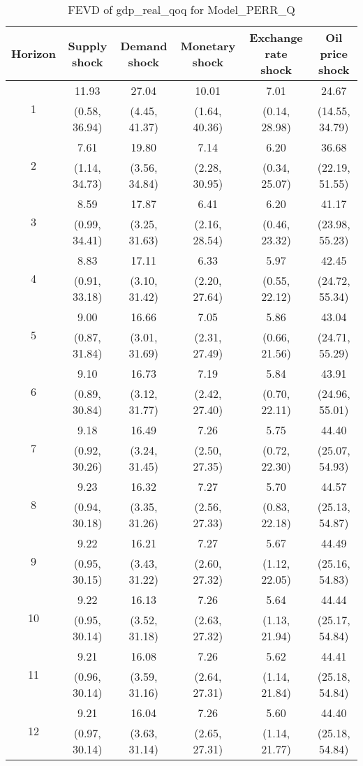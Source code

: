 \documentclass{article}
\begin{document}
\begin{table}
	\footnotesize
	\caption{FEVD of gdp_real_qoq for Model_PERR_Q}
	\begin{tabular}{cccccc}
		Horizon & Supply shock & Demand shock & Monetary shock & Exchange rate shock & Oil price shock\\ \hline
		\multirow{2}{*}{1} & 11.93 & 27.04 & 10.01 & 7.01 & 24.67\\
		 & (0.58, 36.94) & (4.45, 41.37) & (1.64, 40.36) & (0.14, 28.98) & (14.55, 34.79)\\
		\multirow{2}{*}{2} & 7.61 & 19.80 & 7.14 & 6.20 & 36.68\\
		 & (1.14, 34.73) & (3.56, 34.84) & (2.28, 30.95) & (0.34, 25.07) & (22.19, 51.55)\\
		\multirow{2}{*}{3} & 8.59 & 17.87 & 6.41 & 6.20 & 41.17\\
		 & (0.99, 34.41) & (3.25, 31.63) & (2.16, 28.54) & (0.46, 23.32) & (23.98, 55.23)\\
		\multirow{2}{*}{4} & 8.83 & 17.11 & 6.33 & 5.97 & 42.45\\
		 & (0.91, 33.18) & (3.10, 31.42) & (2.20, 27.64) & (0.55, 22.12) & (24.72, 55.34)\\
		\multirow{2}{*}{5} & 9.00 & 16.66 & 7.05 & 5.86 & 43.04\\
		 & (0.87, 31.84) & (3.01, 31.69) & (2.31, 27.49) & (0.66, 21.56) & (24.71, 55.29)\\
		\multirow{2}{*}{6} & 9.10 & 16.73 & 7.19 & 5.84 & 43.91\\
		 & (0.89, 30.84) & (3.12, 31.77) & (2.42, 27.40) & (0.70, 22.11) & (24.96, 55.01)\\
		\multirow{2}{*}{7} & 9.18 & 16.49 & 7.26 & 5.75 & 44.40\\
		 & (0.92, 30.26) & (3.24, 31.45) & (2.50, 27.35) & (0.72, 22.30) & (25.07, 54.93)\\
		\multirow{2}{*}{8} & 9.23 & 16.32 & 7.27 & 5.70 & 44.57\\
		 & (0.94, 30.18) & (3.35, 31.26) & (2.56, 27.33) & (0.83, 22.18) & (25.13, 54.87)\\
		\multirow{2}{*}{9} & 9.22 & 16.21 & 7.27 & 5.67 & 44.49\\
		 & (0.95, 30.15) & (3.43, 31.22) & (2.60, 27.32) & (1.12, 22.05) & (25.16, 54.83)\\
		\multirow{2}{*}{10} & 9.22 & 16.13 & 7.26 & 5.64 & 44.44\\
		 & (0.95, 30.14) & (3.52, 31.18) & (2.63, 27.32) & (1.13, 21.94) & (25.17, 54.84)\\
		\multirow{2}{*}{11} & 9.21 & 16.08 & 7.26 & 5.62 & 44.41\\
		 & (0.96, 30.14) & (3.59, 31.16) & (2.64, 27.31) & (1.14, 21.84) & (25.18, 54.84)\\
		\multirow{2}{*}{12} & 9.21 & 16.04 & 7.26 & 5.60 & 44.40\\
		 & (0.97, 30.14) & (3.63, 31.14) & (2.65, 27.31) & (1.14, 21.77) & (25.18, 54.84)\\
	\end{tabular}
\label{tab:fevd-Model_PERR_Q-gdp_real_qoq}
\end{table}
\end{document}

